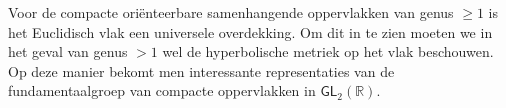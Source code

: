 \documentclass[12pt]{book}
\newcommand{\R}{\mathbb{R}}
\begin{document}

Voor de compacte ori\"enteerbare samenhangende oppervlakken van genus $\geq 1$ is het Euclidisch vlak een universele overdekking. Om dit in te zien moeten we in het geval van genus $>1$ wel de hyperbolische metriek op het vlak beschouwen.
Op deze manier bekomt men interessante representaties van de fundamentaalgroep van compacte oppervlakken in $\mathsf{GL}_{2}(\R)$.
\end{document}
